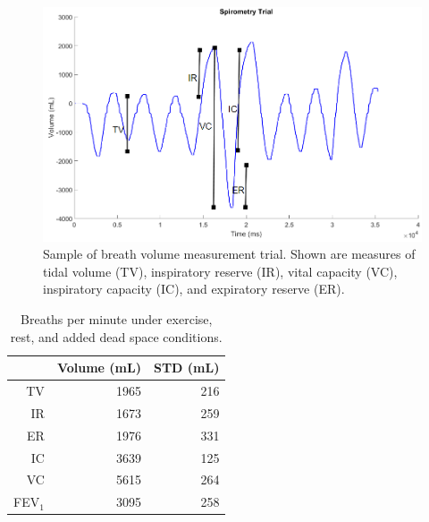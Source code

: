 \documentclass[12pt]{article}
\begin{document}
\begin{figure}[H]
	
	\centering
	\includegraphics[width = .8\textwidth]{Figures/BreathVols.png}
	\caption{Sample of breath volume measurement trial. Shown are measures of tidal volume (TV), inspiratory reserve (IR), vital capacity (VC), inspiratory capacity (IC), and expiratory reserve (ER).}
	\label{fig:Vols}
\end{figure}

\begin{table}[H]
	\centering{}
	\caption{Breaths per minute under exercise, rest, and added dead space conditions. }
	\label{tab:vols}
	\begin{tabular}{|r|r|r|}
		\hline
		& Volume (mL) & STD (mL)\\
		\hline
		
		TV&1965 & 216 \\
		\hline
		IR&1673 & 259 \\
		\hline
		ER&1976 & 331 \\
		\hline
		IC&3639 & 125 \\
		\hline
		VC&5615 & 264 \\
		\hline
		FEV$_1$&3095 & 258 \\
		\hline
		
		
	\end{tabular}
\end{table}
\end{document}
